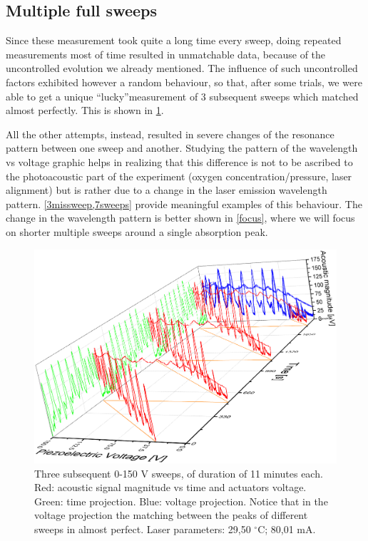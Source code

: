 	\subsection{Multiple full sweeps}
Since these measurement took quite a long time every sweep, doing repeated measurements most of time resulted in unmatchable data, because of the uncontrolled evolution we already mentioned. The influence of such uncontrolled factors exhibited however a random behaviour, so that, after some trials, we were able to get a unique \textquotedblleft lucky\textquotedblright measurement of 3 subsequent sweeps which matched almost perfectly. This is shown in \cref{3sweep}.

All the other attempts, instead, resulted in severe changes of the resonance pattern between one sweep and another. Studying the pattern of the wavelength vs voltage graphic helps in realizing that this difference is not to be ascribed to the photoacoustic part of the experiment (oxygen concentration/pressure, laser alignment) but is rather due to a change in the laser emission wavelength pattern. \cref{3missweep,7sweeps} provide meaningful examples of this behaviour.
The change in the wavelength pattern is better shown in \cref{focus}, where we will focus
on shorter multiple sweeps around a single absorption peak.
\begin{landscape}
\begin{figure}[!bhtp]\centering
\includegraphics[height=\textheight, draft=\foto]{eps/3sweepsmatching.eps}
\caption{Three subsequent 0-150 V sweeps, of duration of 11 minutes each. Red: acoustic signal magnitude vs time and actuators voltage. Green: time projection. Blue: voltage projection. Notice that in the voltage projection the matching between the peaks of different sweeps in almost perfect. Laser parameters: 29,50 $^\circ$C; 80,01 mA.}
\label{3sweep}
\end{figure}\vfill
\end{landscape}

